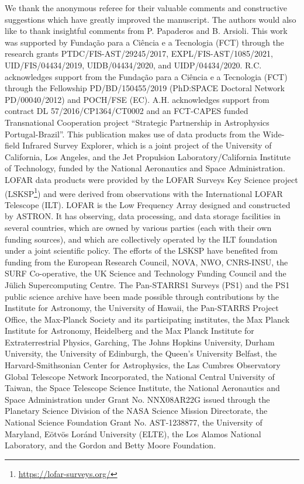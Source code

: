 \documentclass{aa}
\begin{document}
\begin{acknowledgements}
We thank the anonymous referee for their valuable comments
and constructive suggestions which have greatly improved the
manuscript. The authors would also like to thank insightful comments from P. Papaderos and B. Arsioli.
This work was supported by Fundação para a Ciência e a Tecnologia (FCT) through the research grants PTDC/FIS-AST/29245/2017, EXPL/FIS-AST/1085/2021, UID/FIS/04434/2019, UIDB/04434/2020, and UIDP/04434/2020. R.C. acknowledges support from the Fundação para a Ciência e a Tecnologia (FCT) through the Fellowship PD/BD/150455/2019 (PhD:SPACE Doctoral Network PD/00040/2012) and POCH/FSE (EC). A.H. acknowledges support from contract DL 57/2016/CP1364/CT0002 and an FCT-CAPES funded Transnational Cooperation project ``Strategic Partnership in Astrophysics Portugal-Brazil''.
This publication makes use of data products from the Wide-field Infrared Survey Explorer, which is a joint project of the University of California, Los Angeles, and the Jet Propulsion Laboratory/California Institute of Technology, funded by the National Aeronautics and Space Administration.
LOFAR data products were provided by the LOFAR Surveys Key Science project (LSKSP\footnote{\url{https://lofar-surveys.org/}}) and were derived from observations with the International LOFAR Telescope (ILT). LOFAR \citep{2013A&A...556A...2V} is the Low Frequency Array designed and constructed by ASTRON. It has observing, data processing, and data storage facilities in several countries, which are owned by various parties (each with their own funding sources), and which are collectively operated by the ILT foundation under a joint scientific policy. The efforts of the LSKSP have benefited from funding from the European Research Council, NOVA, NWO, CNRS-INSU, the SURF Co-operative, the UK Science and Technology Funding Council and the Jülich Supercomputing Centre.
The Pan-STARRS1 Surveys (PS1) and the PS1 public science archive have been made possible through contributions by the Institute for Astronomy, the University of Hawaii, the Pan-STARRS Project Office, the Max-Planck Society and its participating institutes, the Max Planck Institute for Astronomy, Heidelberg and the Max Planck Institute for Extraterrestrial Physics, Garching, The Johns Hopkins University, Durham University, the University of Edinburgh, the Queen's University Belfast, the Harvard-Smithsonian Center for Astrophysics, the Las Cumbres Observatory Global Telescope Network Incorporated, the National Central University of Taiwan, the Space Telescope Science Institute, the National Aeronautics and Space Administration under Grant No. NNX08AR22G issued through the Planetary Science Division of the NASA Science Mission Directorate, the National Science Foundation Grant No. AST-1238877, the University of Maryland, E\"{o}tv\"{o}s Lor\'{a}nd University (ELTE), the Los Alamos National Laboratory, and the Gordon and Betty Moore Foundation.

\end{acknowledgements}
\end{document}
